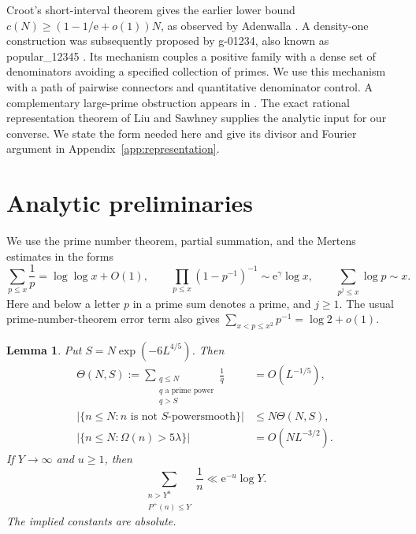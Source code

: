 \documentclass[11pt,leqno]{amsart}
\numberwithin{equation}{section}
\newtheorem{lemma}[theorem]{Lemma}
\theoremstyle{definition}
\theoremstyle{remark}
\newcommand{\e}{\mathrm e}
\newcommand{\Ph}{P^{+}}
\newcommand{\card}[1]{\lvert #1\rvert}
\begin{document}
Croot's short-interval theorem \cite{Croot} gives the earlier lower bound
$c(N)\ge(1-1/\e+o(1))N$, as observed by Adenwalla
\cite{Bloom319}. A density-one construction was subsequently proposed
by g-01234, also known as popular\_12345 \cite{DensityOne}. Its mechanism
couples a positive family with a dense set of denominators avoiding a
specified collection of primes. We use this mechanism with a path of
pairwise connectors and quantitative denominator control. A complementary
large-prime obstruction appears in \cite{RexHannes}. The exact rational
representation theorem of Liu and Sawhney \cite{LS} supplies the analytic
input for our converse. We state the form needed here and give its
divisor and Fourier argument in Appendix~\ref{app:representation}.

\section{Analytic preliminaries}\label{sec:prelim}

We use the prime number theorem, partial summation, and the Mertens
estimates in the forms
\begin{equation}\label{eq:mertens}
 \sum_{p\le x}\frac1p=\log\log x+O(1),\qquad
 \prod_{p\le x}(1-p^{-1})^{-1}\sim\e^\gamma\log x,
 \qquad \sum_{p^j\le x}\log p\sim x.
\end{equation}
Here and below a letter $p$ in a prime sum denotes a prime, and $j\ge1$.
The usual prime-number-theorem error term also gives
$\sum_{x<p\le x^2}p^{-1}=\log2+o(1)$.

\begin{lemma}\label{lem:cleanestimates}
Put $S=N\exp(-6L^{4/5})$. Then
\begin{align}
 \Theta(N,S):=\sum_{\substack{q\le N\\q\text{ a prime power}\\q>S}}
 \frac1q&=O(L^{-1/5}),\label{eq:pptail}\\
 \card{\{n\le N:n\text{ is not }S\text{-powersmooth}\}}
 &\le N\Theta(N,S),\label{eq:nonsmooth}\\
 \card{\{n\le N:\Omega(n)>5\lambda\}}&=O(NL^{-3/2}).
 \label{eq:omega}
\end{align}
If $Y\longrightarrow\infty$ and $u\ge1$, then
\begin{equation}\label{eq:rankin}
 \sum_{\substack{n>Y^u\\\Ph(n)\le Y}}\frac1n
 \ll \e^{-u}\log Y.
\end{equation}
The implied constants are absolute.
\end{lemma}
\end{document}
